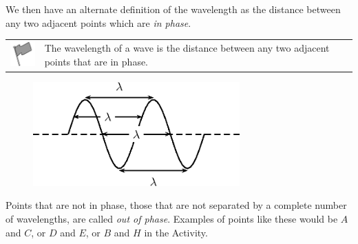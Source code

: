         \label{m38806*id319082}We then have an alternate definition of the wavelength as the distance between any two adjacent points which are \textsl{in phase}.\par 
\label{m38806*fhsst!!!underscore!!!id408}\begin{definition}
	  \begin{tabular*}{15 cm}{m{15 mm}m{}}
	\hspace*{-50pt}  \includegraphics[width=0.5in]{col11305.imgs/psflag2.png}   & \Definition{   \label{id2440434}\textbf{ Wavelength of wave }} { \label{m38806*meaningfhsst!!!underscore!!!id408}
        \label{m38806*id319098}The wavelength of a wave is the distance between any two adjacent points that are in phase. \par 
         } 
      \end{tabular*}
      \end{definition}
        \label{m38806*id319111}
    \setcounter{subfigure}{0}
	\begin{figure}[H] %
    \begin{center}
    \label{m38806*id319114!!!underscore!!!media}\label{m38806*id319114!!!underscore!!!printimage}\includegraphics[width=300px]{col11305.imgs/m38806_PG10C5_011.png} %
      \vspace{2pt}
    \vspace{.1in}
    \end{center}
 \end{figure}       
        \par 
        \label{m38806*id319121}Points that are not in phase, those that are not separated by a complete number of wavelengths, are called \textsl{out of phase}. Examples of points like these would be $A$ and $C$, or $D$ and $E$, or $B$ and $H$ in the Activity.\par 
      \label{m38806*uid20}
